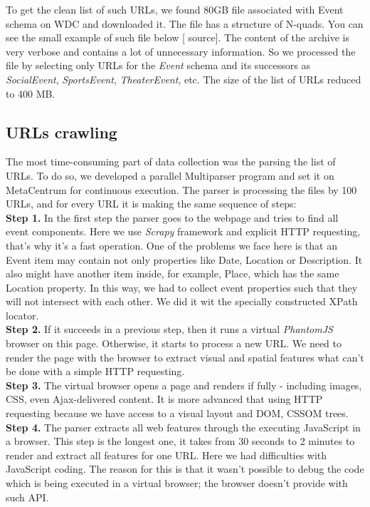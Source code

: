 To get the clean list of such URLs, we found 80GB file associated with Event schema on WDC and downloaded it. The file has a structure of N-quads. You can see the small example of such file below [ source]. The content of the archive is very verbose and contains a lot of unnecessary information. So we processed the file by selecting only URLs for the \textit{Event} schema and its successors as \textit{SocialEvent}, \textit{SportsEvent}, \textit{TheaterEvent}, etc. The size of the list of URLs reduced to 400 MB. 

\subsection{URLs crawling}
\label{sec:urlparse}

The most time-consuming part of data collection was the parsing the list of URLs. To do so, we developed a parallel Multiparser program and set it on MetaCentrum for continuous execution. The parser is processing the files by 100 URLs, and for every URL it is making the same sequence of steps:\\

\noindent\textbf{Step 1.} In the first step the parser goes to the webpage and tries to find all event components. Here we use \textit{Scrapy} framework and explicit HTTP requesting, that's why it's a fast operation. One of the problems we face here is that an Event item may contain not only properties like Date, Location or Description. It also might have another item inside, for example, Place, which has the same Location property. In this way, we had to collect event properties such that they will not intersect with each other. We did it wit the specially constructed XPath locator. \\

\noindent\textbf{Step 2.} If it succeeds in a previous step, then it runs a virtual \textit{PhantomJS} browser on this page. Otherwise, it starts to process a new URL. We need to render the page with the browser to extract visual and spatial features what can't be done with a simple HTTP requesting.\\

\noindent\textbf{Step 3.} The virtual browser opens a page and renders if fully - including images, CSS, even Ajax-delivered content. It is more advanced that using HTTP requesting because we have access to a visual layout and DOM, CSSOM trees.\\

\noindent\textbf{Step 4.} The parser extracts all web features through the executing JavaScript in a browser. This step is the longest one, it takes from 30 seconds to 2 minutes to render and extract all features for one URL. Here we had difficulties with JavaScript coding. The reason for this is that it wasn't possible to debug the code which is being executed in a virtual browser; the browser doesn't provide with such API.\\

